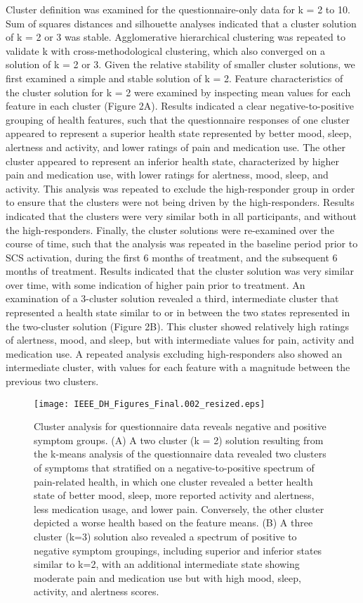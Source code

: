 \documentclass[conference]{IEEEtran}
\begin{document}
Cluster definition was examined for the questionnaire-only data for k = 2 to 10. Sum of squares distances and silhouette analyses indicated that a cluster solution of k = 2 or 3 was stable. Agglomerative hierarchical clustering was repeated to validate k with cross-methodological clustering, which also converged on a solution of k = 2 or 3. Given the relative stability of smaller cluster solutions, we first examined a simple and stable solution of k = 2. Feature characteristics of the cluster solution for k = 2 were examined by inspecting mean values for each feature in each cluster (Figure 2A). Results indicated a clear negative-to-positive grouping of health features, such that the questionnaire responses of one cluster appeared to represent a superior health state represented by better mood, sleep, alertness and activity, and lower ratings of pain and medication use. The other cluster appeared to represent an inferior health state, characterized by higher pain and medication use, with lower ratings for alertness, mood, sleep, and activity. This analysis was repeated to exclude the  high-responder group in order to ensure that the clusters were not being driven by the high-responders. Results indicated that the clusters were very similar both in all participants, and without the high-responders. Finally, the cluster solutions were re-examined over the course of time, such that the analysis was repeated in the baseline period prior to SCS activation, during the first 6 months of treatment, and the subsequent 6 months of treatment. Results indicated that the cluster solution was very similar over time, with some indication of higher pain prior to treatment. An examination of a 3-cluster solution revealed a third, intermediate cluster that represented a health state similar to or in between the two states represented in the two-cluster solution (Figure 2B). This cluster showed relatively high ratings of alertness, mood, and sleep, but with intermediate values for pain, activity and medication use. A repeated analysis excluding high-responders also showed an intermediate cluster, with values for each feature with a magnitude between the previous two clusters.

\begin{figure}[htbp]
\centerline{\texttt{[image: IEEE\_DH\_Figures\_Final.002\_resized.eps]}}
\caption{Cluster analysis for questionnaire data reveals negative and positive symptom groups. (A) A two cluster (k = 2) solution resulting from the k-means analysis of the questionnaire data revealed two clusters of symptoms that stratified on a negative-to-positive spectrum of pain-related health, in which one cluster revealed a better health state of better mood, sleep, more reported activity and alertness, less medication usage, and lower pain. Conversely, the other cluster depicted a worse health based on the feature means. (B) A three cluster (k=3) solution also revealed a spectrum of positive to negative symptom groupings, including superior and inferior states similar to k=2, with an additional intermediate state showing moderate pain and medication use but with high mood, sleep, activity, and alertness scores.}
\label{fig}
\end{figure}
\end{document}

